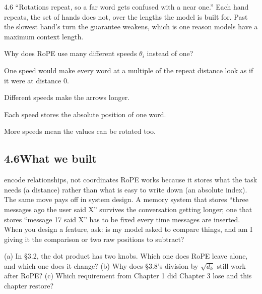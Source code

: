 \begin{wrongidea}{4.6}
``Rotations repeat, so a far word gets confused with a near one.'' Each hand repeats, the set of hands
does not, over the lengths the model is built for. Past the slowest hand's turn the guarantee weakens,
which is one reason models have a maximum context length.
\end{wrongidea}

\begin{checkq}
Why does RoPE use many different speeds $\theta_i$ instead of one?
\begin{options}
\item One speed would make every word at a multiple of the repeat distance look as if it were at distance 0.
\item Different speeds make the arrows longer.
\item Each speed stores the absolute position of one word.
\item More speeds mean the values can be rotated too.
\end{options}
\end{checkq}


\subsection*{4.6\quad What we built}

\begin{principle}{encode relationships, not coordinates}
RoPE works because it stores what the task needs (a distance) rather than what is easy to write down (an
absolute index). The same move pays off in system design. A memory system that stores ``three messages
ago the user said X'' survives the conversation getting longer; one that stores ``message 17 said X'' has
to be fixed every time messages are inserted. When you design a feature, ask: is my model asked to
compare things, and am I giving it the comparison or two raw positions to subtract?
\end{principle}

\begin{lookingback}
(a) In \S3.2, the dot product has two knobs. Which one does RoPE leave alone, and which one does it
change? (b) Why does \S3.8's division by $\sqrt{d_k}$ still work after RoPE? (c) Which requirement from
Chapter 1 did Chapter 3 lose and this chapter restore?
\end{lookingback}

